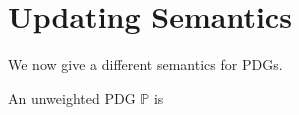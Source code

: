 \documentclass[the-pdg-manual.tex]{subfiles}
\begin{document}
    
    \section{Updating Semantics}
    We now give a different semantics for PDGs.
    
    An unweighted PDG $\mathbb P$ is 
    
\end{document}
